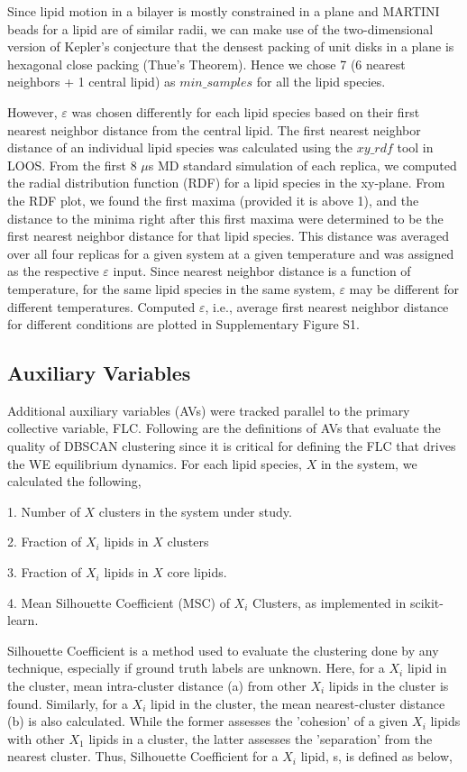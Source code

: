 \documentclass{biophys-new}
\begin{document}
Since lipid motion in a bilayer is mostly constrained in a plane and MARTINI beads for a lipid are of similar radii, we can make use of the two-dimensional
version of Kepler's conjecture that the densest packing of unit disks in a plane is hexagonal close packing (Thue's Theorem).
Hence we chose 7 (6 nearest neighbors + 1 central lipid) as $min\_samples$ for all the lipid species.

However, $\varepsilon$ was chosen differently for each lipid species based on their first nearest neighbor distance from the central lipid.
The first nearest neighbor distance of an individual lipid species was calculated using the $xy\_rdf$ tool in LOOS.
From the first 8 $\mu$s MD standard simulation of each replica, we computed the radial distribution function (RDF) for a lipid species in the xy-plane. 
From the RDF plot, we found the first maxima (provided it is above 1), and the distance to the minima right after this first maxima were determined to be the first nearest neighbor distance for that lipid species.
This distance was averaged over all four replicas for a given system at a given temperature and was assigned as the respective $\varepsilon$ input.
Since nearest neighbor distance is a function of temperature, for the same lipid species in the same system, $\varepsilon$ may be different for different temperatures.
Computed $\varepsilon$, i.e., average first nearest neighbor distance for different conditions are plotted in Supplementary Figure S1.

\subsection*{Auxiliary Variables}

Additional auxiliary variables (AVs) were tracked parallel to the primary collective variable, FLC. 
Following are the definitions of AVs that evaluate the quality of DBSCAN clustering since it is critical for defining the FLC that drives the WE equilibrium dynamics. 
For each lipid species, $X$ in the system, we calculated the following, 

1. Number of $X$ clusters in the system under study.

2. Fraction of $X_i$ lipids in $X$ clusters

3. Fraction of $X_i$ lipids in $X$ core lipids.

4. Mean Silhouette Coefficient (MSC) of $X_i$ Clusters, as implemented in scikit-learn.

Silhouette Coefficient is a method used to evaluate the clustering done by any technique, especially if ground truth labels are unknown. 
Here, for a $X_i$ lipid in the cluster, mean intra-cluster distance (a) from other $X_i$ lipids in the cluster is found.  
Similarly, for a $X_i$ lipid in the cluster, the mean nearest-cluster distance (b) is also calculated.
While the former assesses the 'cohesion' of a given $X_i$ lipids with other $X_1$ lipids in a cluster, the latter assesses the 'separation' from the nearest cluster.
Thus, Silhouette Coefficient for a $X_i$ lipid, s, is defined as below,
\end{document}
